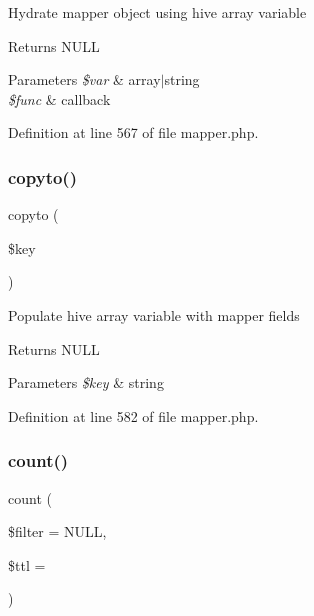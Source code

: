 Hydrate mapper object using hive array variable \begin{DoxyReturn}{Returns}
N\+U\+LL 
\end{DoxyReturn}

\begin{DoxyParams}{Parameters}
{\em \$var} & array$\vert$string \\
\hline
{\em \$func} & callback \\
\hline
\end{DoxyParams}


Definition at line 567 of file mapper.\+php.

\hypertarget{class_d_b_1_1_s_q_l_1_1_mapper_a4bcf54f913758fb093c35ea81fc29615}{}\label{class_d_b_1_1_s_q_l_1_1_mapper_a4bcf54f913758fb093c35ea81fc29615} 
\subsubsection{\texorpdfstring{copyto()}{copyto()}}
{\footnotesize\ttfamily copyto (\begin{DoxyParamCaption}\item[{}]{\$key }\end{DoxyParamCaption})}

Populate hive array variable with mapper fields \begin{DoxyReturn}{Returns}
N\+U\+LL 
\end{DoxyReturn}

\begin{DoxyParams}{Parameters}
{\em \$key} & string \\
\hline
\end{DoxyParams}


Definition at line 582 of file mapper.\+php.

\hypertarget{class_d_b_1_1_s_q_l_1_1_mapper_ab1f3a3bd85dca49dceaea57f2fe21abf}{}\label{class_d_b_1_1_s_q_l_1_1_mapper_ab1f3a3bd85dca49dceaea57f2fe21abf} 
\subsubsection{\texorpdfstring{count()}{count()}}
{\footnotesize\ttfamily count (\begin{DoxyParamCaption}\item[{}]{\$filter = {\ttfamily NULL},  }\item[{}]{\$ttl = {} }\end{DoxyParamCaption})}

